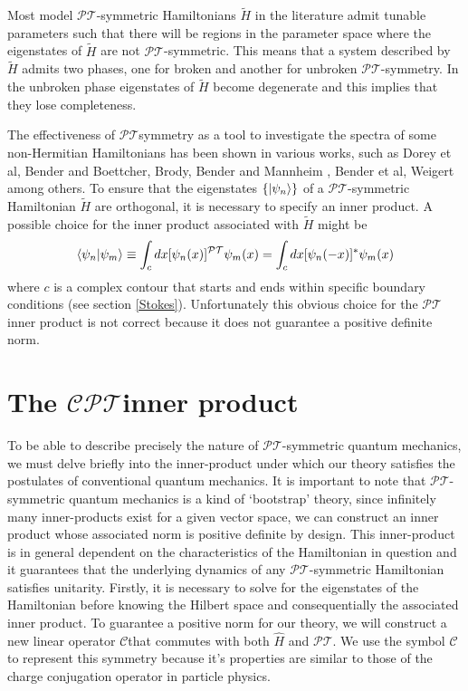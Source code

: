 \documentclass[12pt, a4paper]{report}
\newcommand\PT{\(\mathcal{PT}\)}
\newcommand\CC{\(\mathcal{C}\)}
\begin{document}
Most model \PT-symmetric Hamiltonians $\tilde{H}$ in the literature admit tunable parameters such that there will be regions in the parameter space where the eigenstates of $\tilde{H}$ are not \PT-symmetric\cite{Brody_2013}. This means that a system described by $\tilde{H}$ admits two phases, one for broken and another for unbroken \PT-symmetry. In the unbroken phase eigenstates of $\tilde{H}$ become degenerate and this implies that they lose completeness\cite{Brody_2013}. 

The effectiveness of \PT\:symmetry as a tool to investigate the spectra of some non-Hermitian Hamiltonians has been shown in various works, such as Dorey et al\cite{Dorey_2001, Dorey_2004}, Bender and Boettcher\cite{RealSpectrainNHH}, Brody\cite{Brody_2016}, Bender and Mannheim \cite{Bender_2010}, Bender et al\cite{PTsymmetricQM}, Weigert\cite{Weigert_2003} among others.
To ensure that the eigenstates $\{\ket{\psi_n}\}$ of a \PT-symmetric Hamiltonian $\tilde{H}$ are orthogonal, it is necessary to specify an inner product. A possible choice for the inner product associated with $\tilde{H}$ might be\cite{PTsymmetricQM}
\begin{equation}\label{eq:2.3}
\braket{\psi_n|\psi_m} \equiv \int_{c} dx [\psi_{n}(x)]^{\mathcal{PT}}\psi_m(x) = \int_{c} dx [\psi_{n}(-x)]^{*}\psi_m(x)
\end{equation}
where $c$ is a complex contour that starts and ends within specific boundary conditions (see section \ref{Stokes}). Unfortunately this obvious choice for the \PT\:inner product is not correct because it does not guarantee a positive definite norm.

\section{The \texorpdfstring{$\mathcal{CPT}$}\:\:inner product}\label{CPT}
To be able to describe precisely the nature of \PT-symmetric quantum mechanics, we must delve briefly into the inner-product under which our theory satisfies the postulates of conventional quantum mechanics. It is important to note that \PT-symmetric quantum mechanics is a kind of `bootstrap' theory\cite{MakingSense}, since infinitely many inner-products exist for a given vector space, we can construct an inner product whose associated norm is positive definite by design. This inner-product is in general dependent on the characteristics of the Hamiltonian in question and it guarantees that the underlying dynamics of any \PT-symmetric Hamiltonian satisfies unitarity\cite{MustaHbeHermitian}.
Firstly, it is necessary to solve for the eigenstates of the Hamiltonian before knowing the Hilbert space and consequentially the associated inner product.
To guarantee a positive norm for our theory, we will construct a new linear operator \CC\:that commutes with both $\hat{H}$ and \PT. We use the symbol \CC\: to represent this symmetry because it's properties are similar to those of the charge conjugation operator in particle physics\cite{MakingSense}.
\end{document}
